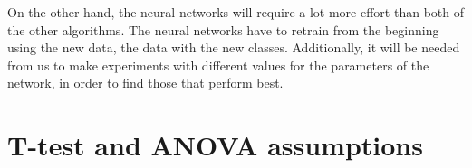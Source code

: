 \documentclass[a4paper,11pt]{article}
\begin{document}
On the other hand, the neural networks will require a lot more effort than both
of the other algorithms. The neural networks have to retrain from the beginning
using the new data, the data with the new classes. Additionally, it will be
needed from us to make experiments with different values for the parameters of
the network, in order to find those that perform best.  

\section{T-test and ANOVA assumptions}
\end{document}
